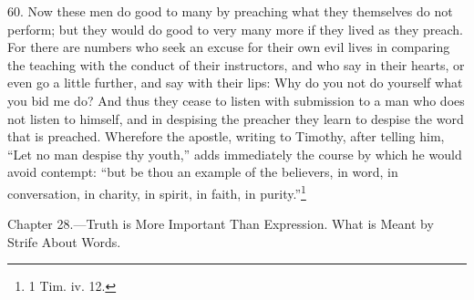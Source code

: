 60. Now these men do good to many by preaching what they themselves do not perform; but they would do good to very many  more if they lived as they preach. For there are numbers who seek an excuse for their own evil lives in comparing the teaching with the conduct of their instructors, and who say in their hearts, or even go a little further, and say with their lips: Why do you not do yourself what you bid me do? And thus they cease to listen with submission to a man who does not listen to himself, and in despising the preacher they learn to despise the word that is preached. Wherefore the apostle, writing to Timothy, after telling him, “Let no man despise thy youth,” adds immediately the course by which he would avoid contempt: “but be thou an example of the believers, in word, in conversation, in charity, in spirit, in faith, in purity.”\footnote{1 Tim. iv. 12.}


Chapter 28.—Truth is More Important Than Expression. What is Meant by Strife About Words.

